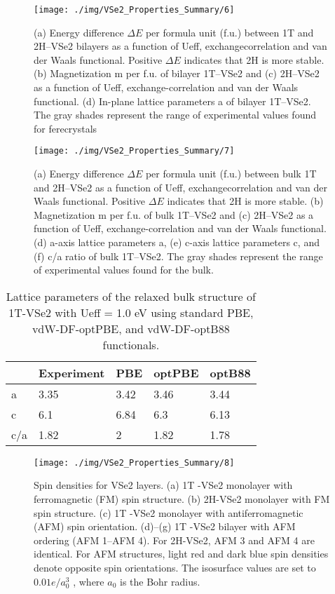 \documentclass[reprint, aps, prb, showkeys]{revtex4-2}
\begin{document}
\begin{figure*}
    \texttt{[image: ./img/VSe2\_Properties\_Summary/6]}
    \caption{\label{fig:PhysRevB.96.235147_Bilayer} 
    (a) Energy difference $\Delta E$ per formula unit (f.u.) between 1T and 2H–VSe2 bilayers as a function of Ueff, exchangecorrelation and van der Waals functional. Positive $\Delta E$ indicates that 2H is more stable. (b) Magnetization m per f.u. of bilayer 1T–VSe2 and (c) 2H–VSe2 as a function of Ueff, exchange-correlation and van der Waals functional. (d) In-plane lattice parameters a of bilayer 1T–VSe2. The gray shades represent the range of experimental values found for ferecrystals
    }
\end{figure*}

\begin{figure*}
    \texttt{[image: ./img/VSe2\_Properties\_Summary/7]}
    \caption{\label{fig:PhysRevB.96.235147_Bulk} 
    (a) Energy difference $\Delta E$ per formula unit (f.u.) between bulk 1T and 2H–VSe2 as a function of Ueff, exchangecorrelation and van der Waals functional. Positive $\Delta E$ indicates that 2H is more stable. (b) Magnetization m per f.u. of bulk 1T–VSe2 and (c) 2H–VSe2 as a function of Ueff, exchange-correlation and van der Waals functional. (d) a-axis lattice parameters a, (e) c-axis lattice parameters c, and (f) c/a ratio of bulk 1T–VSe2. The gray shades represent the range of experimental values found for the bulk.
    }
\end{figure*}

\begin{table}[]
    \caption{\label{table:PhysRevB.96.235147_LatticeConst} Lattice parameters of the relaxed bulk structure of 1T-VSe2 with Ueff = 1.0 eV using standard PBE, vdW-DF-optPBE, and vdW-DF-optB88 functionals.
    }
    \begin{ruledtabular}
    \begin{tabular}{lllll}
        & Experiment & PBE  & optPBE & optB88 \\
    \hline
    a   & 3.35       & 3.42 & 3.46   & 3.44   \\
    c   & 6.1        & 6.84 & 6.3    & 6.13   \\
    c/a & 1.82       & 2    & 1.82   & 1.78       
    \end{tabular}
    \end{ruledtabular}
\end{table}

\begin{figure}
    \texttt{[image: ./img/VSe2\_Properties\_Summary/8]}
    \caption{\label{fig:PhysRevB.96.235147_MagConfiguration} 
    Spin densities for VSe2 layers. (a) 1T -VSe2 monolayer with ferromagnetic (FM) spin structure. (b) 2H-VSe2 monolayer with FM spin structure. (c) 1T -VSe2 monolayer with antiferromagnetic (AFM) spin orientation. (d)–(g) 1T -VSe2 bilayer with AFM ordering (AFM 1–AFM 4). For 2H-VSe2, AFM 3 and AFM 4 are identical. For AFM structures, light red and dark blue spin densities denote opposite spin orientations. The isosurface values are set to $0.01e/a^3_0$ , where $a_0$ is the Bohr radius.
    }
\end{figure}
\end{document}
